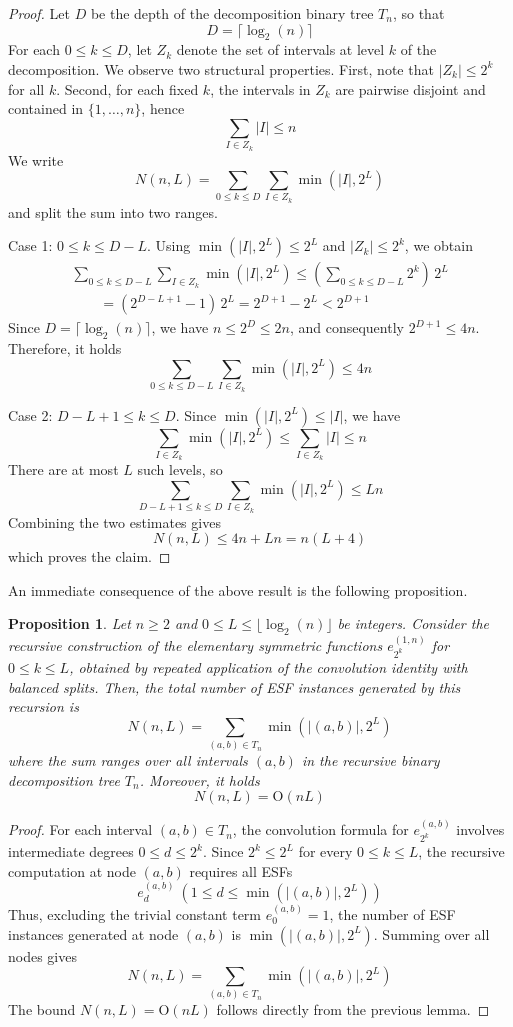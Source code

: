 \documentclass{amsart}
\newtheorem{proposition}[theorem]{Proposition}
\def\cO{{\mathrm{O}}}
\begin{document}
\begin{proof}
Let $D$ be the depth of the decomposition binary tree $T_n$, so that
\[
D = \lceil \log_2(n) \rceil
\]
For each $0\leq k\leq D$, let $Z_k$ denote the set of intervals at level $k$ of the decomposition.
We observe two structural properties. First, note that $|Z_k|\leq 2^k$ for all $k$. Second, for each
fixed $k$, the intervals in $Z_k$ are pairwise disjoint and contained in $\{1,\dots,n\}$, hence
\[
\sum_{I\in Z_k} |I| \leq n
\]
We write
\[
N(n,L) = \sum_{0\leq k\leq D}\sum_{I\in Z_k} \min(|I|,2^L)
\]
and split the sum into two ranges.

Case 1: $0\leq k\leq D-L$. Using $\min(|I|,2^L)\leq 2^L$ and $|Z_k|\leq 2^k$, we obtain
\[
\begin{array}{l}
\sum_{0\leq k\leq D-L} \sum_{I\in Z_k} \min(|I|,2^L) \leq
(\sum_{0\leq k\leq D-L} 2^k)\, 2^L \\ [6pt]
\qquad = (2^{D-L+1}-1)\, 2^L = 2^{D+1} - 2^L < 2^{D+1}
\end{array}
\]
Since $D = \lceil \log_2(n) \rceil$, we have $n\leq 2^D\leq 2 n$, and consequently
$2^{D+1} \leq 4 n$. Therefore, it holds
\[
\sum_{0\leq k\leq D-L} \sum_{I\in Z_k} \min(|I|,2^L)\leq 4 n
\]

Case 2: $D-L+1\leq k\leq D$. Since $\min(|I|,2^L)\leq |I|$, we have
\[
\sum_{I\in Z_k} \min(|I|,2^L) \leq \sum_{I\in Z_k}|I| \leq n
\]
There are at most $L$ such levels, so
\[
\sum_{D-L+1\leq k\leq D} \sum_{I\in Z_k} \min(|I|,2^L) \leq L n
\]
Combining the two estimates gives
\[
N(n,L)\leq 4 n + L n = n(L + 4)
\]
which proves the claim.
\end{proof}

An immediate consequence of the above result is the following proposition.

\begin{proposition}
\label{main2}
Let $n\geq 2$ and $0\leq L\leq \lfloor \log_2(n) \rfloor$ be integers. Consider the recursive
construction of the elementary symmetric functions $e_{2^k}^{(1,n)}$ for $0\leq k \leq L$,
obtained by repeated application of the convolution identity with balanced splits. Then,
the total number of ESF instances generated by this recursion is
\[
N(n,L) = \sum_{(a,b)\in T_n} \min(|(a,b)|,2^L)
\]
where the sum ranges over all intervals $(a,b)$ in the recursive binary decomposition tree $T_n$.
Moreover, it holds
\[
N(n,L) = \cO(n L)
\]
\end{proposition}

\begin{proof}
For each interval $(a,b)\in T_n$, the convolution formula for $e_{2^k}^{(a,b)}$
involves intermediate degrees $0\leq d\leq 2^k$. Since $2^k\leq 2^L$ for every
$0\leq k\leq L$, the recursive computation at node $(a,b)$ requires all ESFs
\[
e_d^{(a,b)}\ (1\leq d\leq \min(|(a,b)|,2^L))
\]
Thus, excluding the trivial constant term $e_0^{(a,b)} = 1$, the number of ESF
instances generated at node $(a,b)$ is $\min(|(a,b)|,2^L)$.
Summing over all nodes gives
\[
N(n,L) = \sum_{(a,b)\in T_n}\min(|(a,b)|,2^L)
\]
The bound $N(n,L) = \cO(nL)$ follows directly from the previous lemma.
\end{proof}
\end{document}
